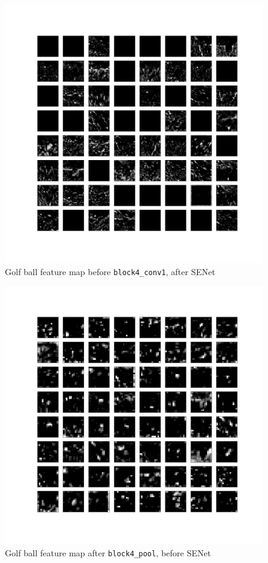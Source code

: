 \documentclass{article}
\begin{document}
\begin{appendices}
\begin{figure}[H]
    \centering
    \includegraphics[width=6in]{csci-8110/hw-3/images/golf-post-SENet-block3_pool-2020-11-05 18_29_46.031795_output.png}
    \caption{Golf ball feature map before \lstinline{block4_conv1}, after SENet}
    \label{fig:golf_3_post}
\end{figure}
\begin{figure}[H]
    \centering
    \includegraphics[width=6in]{csci-8110/hw-3/images/golf-pre-SENet-block4_pool-2020-11-05 18_35_31.491006_output.png}
    \caption{Golf ball feature map after \lstinline{block4_pool}, before SENet}
    \label{fig:golf_4_pre}
\end{figure}


\end{appendices}
\end{document}
